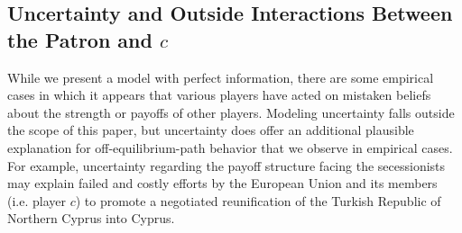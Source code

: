 \documentclass[11pt,letterpaper, notitlepage]{article}
\begin{document}


\subsection{Uncertainty and Outside Interactions Between the Patron and \texorpdfstring{$c$}{c}}
While we present a model with perfect information, there are some empirical cases in which it appears that various players have acted on mistaken beliefs about the strength or payoffs of other players. Modeling uncertainty falls outside the scope of this paper, but uncertainty does offer an additional plausible explanation for off-equilibrium-path behavior that we observe in empirical cases.  For example, uncertainty regarding the payoff structure facing the secessionists may explain failed and costly efforts by the European Union and its members (i.e. player $c$) to promote a negotiated reunification of the Turkish Republic of Northern Cyprus into Cyprus. 
\end{document}
